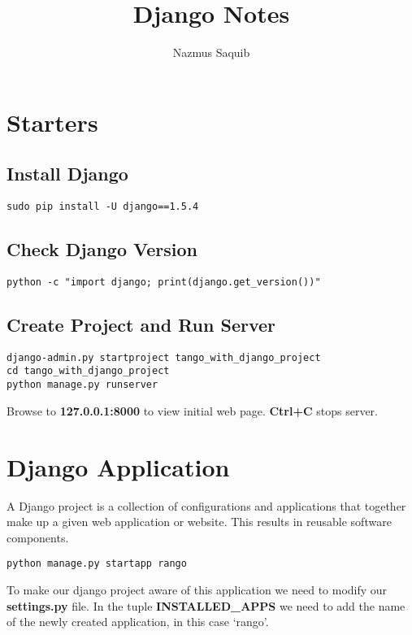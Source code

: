 \documentclass[10pt, a4paper]{article}
\begin{document}
\title{Django Notes}
\author{Nazmus Saquib}

\maketitle
\tableofcontents

\section{Starters}
\subsection{Install Django}
\begin{verbatim}
sudo pip install -U django==1.5.4
\end{verbatim}
\subsection{Check Django Version}
\begin{verbatim}
python -c "import django; print(django.get_version())"
\end{verbatim}
\subsection{Create Project and Run Server}
\begin{verbatim}
django-admin.py startproject tango_with_django_project
cd tango_with_django_project
python manage.py runserver
\end{verbatim}
Browse to \textbf{127.0.0.1:8000} to view initial web page.
\textbf{Ctrl+C} stops server.


\section{Django Application}
A Django project is a collection of configurations and
applications that together make up a given web application
or website. This results in reusable software components.
\begin{verbatim}
python manage.py startapp rango
\end{verbatim}
To make our django project aware of this application we
need to modify our \textbf{settings.py} file. In the
tuple \textbf{INSTALLED\_APPS} we need to add the name
of the newly created application, in this case `rango'.
\end{document}
